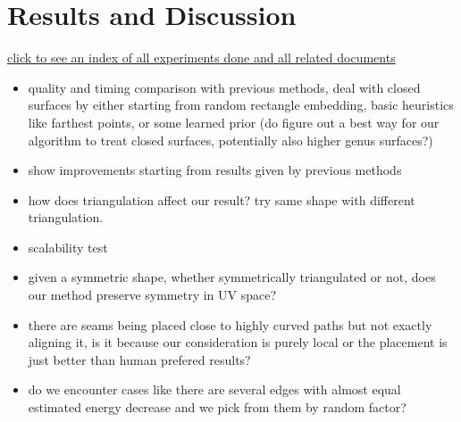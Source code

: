 \section{Results and Discussion}
\label{sec:results}

\href{http://www.cs.ubc.ca/labs/imager/dgp/FracCuts/expResults/}{click to see an index of all experiments done and all related documents}


\begin{itemize}
\item quality and timing comparison with previous methods, deal with closed surfaces by either starting from random rectangle embedding, basic heuristics like farthest points, or some learned prior (do figure out a best way for our algorithm to treat closed surfaces, potentially also higher genus surfaces?)
\item show improvements starting from results given by previous methods
\item how does triangulation affect our result? try same shape with different triangulation.
\item scalability test
\item given a symmetric shape, whether symmetrically triangulated or not, does our method preserve symmetry in UV space?
\item there are seams being placed close to highly curved paths but not exactly aligning it, is it because our consideration is purely local or the placement is just better than human prefered results?
\item do we encounter cases like there are several edges with almost equal estimated energy decrease and we pick from them by random factor?
\end{itemize}